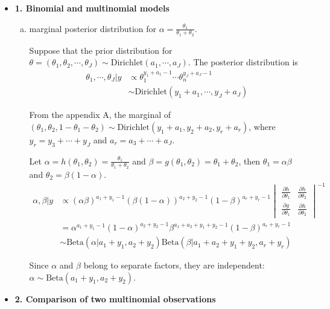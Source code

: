 \documentclass{article}
\begin{document}
\begin{itemize}

\item \textbf{1. Binomial and multinomial models}
\begin{enumerate}[(a)]
\item marginal posterior distribution for $\alpha = \frac{\theta_1}{\theta_1 + \theta_2}$.

Suppose that the prior distribution for $\theta = (\theta_1, \theta_2, \cdots, \theta_J) \sim \text{Dirichlet} (a_1, \cdots, a_J)$.  The posterior distribution is
\begin{align*}
\theta_1, \cdots, \theta_J | y &\propto \theta_1^{y_1+a_1-1} \cdots \theta_n^{y_J+a_J-1} \\
&\sim \text{Dirichlet} (y_1+a_1, \cdots, y_J+a_J)
\end{align*}

From the appendix A, the marginal of $(\theta_1, \theta_2, 1-\theta_1-\theta_2) \sim \text{Dirichlet}(y_1+a_1, y_2+a_2,  y_r + a_r)$, where $y_r = y_3 + \cdots+y_J$ and $a_r = a_3 + \cdots + a_J$.

Let $\alpha = h(\theta_1, \theta_2) = \frac{\theta_1}{\theta_1 + \theta_2}$ and $\beta = g(\theta_1, \theta_2) = \theta_1 + \theta_2$, then $\theta_1 = \alpha\beta$ and $\theta_2 = \beta(1-\alpha)$.
\begin{align*}
\alpha, \beta | y &\propto (\alpha\beta)^{a_1+y_1-1} (\beta(1-\alpha))^{a_2+y_2-1} (1-\beta)^{a_r+y_r -1} \begin{vmatrix} \frac{\partial h}{\partial \theta_1} & \frac{\partial h}{\partial \theta_2} \\ \frac{\partial g}{\partial \theta_1}  & \frac{\partial h}{\partial \theta_2} \end{vmatrix}^{-1} \\
&= \alpha^{a_1+y_1-1} (1-\alpha)^{a_2+y_2-1} \beta^{a_1+a_2+y_1+y_2-1} (1-\beta)^{a_r+y_r-1} \\
&\sim \text{Beta} (\alpha | a_1+y_1, a_2+y_2) \text{Beta}(\beta | a_1+a_2+y_1+y_2, a_r+y_r) 
\end{align*}

Since $\alpha$ and $\beta$ belong to separate factors, they are independent: $\alpha \sim \text{Beta}(a_1+y_1, a_2+y_2)$.

\end{enumerate}

\item \textbf{2. Comparison of two multinomial observations}


\end{itemize}
\end{document}
